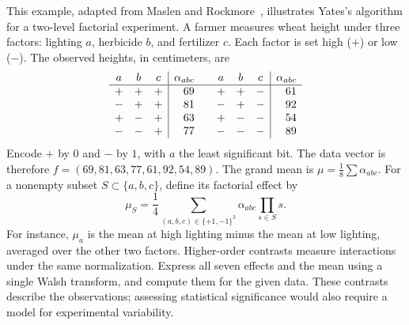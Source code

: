 \begin{exo}
\label{exo-transforme-walsh-statistic}
This example, adapted from Maslen and Rockmore~\cite{rockmore-generalized},
illustrates Yates's algorithm for a two-level factorial experiment.
A farmer measures wheat height under three factors: lighting $a$, herbicide
$b$, and fertilizer $c$. Each factor is set high ($+$) or low ($-$).
The observed heights, in centimeters, are
\[
\begin{array}{ccc|r@{\qquad}ccc|r}
 a&b&c&\alpha_{abc}&a&b&c&\alpha_{abc}\\\hline
 +&+&+&69&+&+&-&61\\
 -&+&+&81&-&+&-&92\\
 +&-&+&63&+&-&-&54\\
 -&-&+&77&-&-&-&89
\end{array}
\]
Encode $+$ by $0$ and $-$ by $1$, with $a$ the least significant bit.
The data vector is therefore $f=(69,81,63,77,61,92,54,89)$.
The grand mean is $\mu=\frac18\sum\alpha_{abc}$. For a nonempty subset
$S\subset\{a,b,c\}$, define its factorial effect by
\[
 \mu_S=\frac14\sum_{(a,b,c)\in\{+1,-1\}^3}
                   \alpha_{abc}\prod_{s\in S}s.
\]
For instance, $\mu_a$ is the mean at high lighting minus the mean at low
lighting, averaged over the other two factors. Higher-order contrasts measure
interactions under the same normalization. Express all seven effects and the
mean using a single Walsh transform, and compute them for the given data.
These contrasts describe the observations; assessing statistical significance
would also require a model for experimental variability.
\end{exo}


